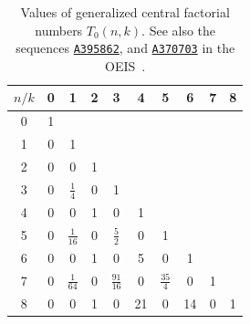 \begin{table}[H]
  \begin{center}
    \setlength\extrarowheight{-6pt}
    \begin{tabular}{c|ccccccccc}
      $n/k$ & 0 & 1 & 2 & 3 & 4 & 5 & 6 & 7 & 8 \\ [3px]
      \hline
      0 & 1 &   &   &   &   &   &   &   &   \\
      1 & 0 & 1 &   &   &   &   &   &   &   \\
      2 & 0 & 0 & 1 &   &   &   &   &   &   \\
      3 & 0 & $\tfrac{1}{4}$ & 0 & 1 &   &   &   &   &   \\
      4 & 0 & 0 & 1 & 0 & 1 &   &   &   &   \\
      5 & 0 & $\tfrac{1}{16}$ & 0 & $\tfrac{5}{2}$ & 0 & 1 &   &   &   \\
      6 & 0 & 0 & 1 & 0 & 5 & 0 & 1 &   &   \\
      7 & 0 & $\tfrac{1}{64}$ & 0 & $\tfrac{91}{16}$ & 0 & $\tfrac{35}{4}$ & 0 & 1 &   \\
      8 & 0 & 0 & 1 & 0 & 21 & 0 & 14 & 0 & 1 \\
    \end{tabular}
  \end{center}
  \caption{Values of generalized central factorial numbers $T_0(n,k)$.
    See also the sequences \href{https://oeis.org/A395862}{\texttt{A395862}},
    and \href{https://oeis.org/A370703}{\texttt{A370703}} in the OEIS~\cite{sloane2003line}.
  }
  \label{tab:central-factorial-numbers-t0}
\end{table}
